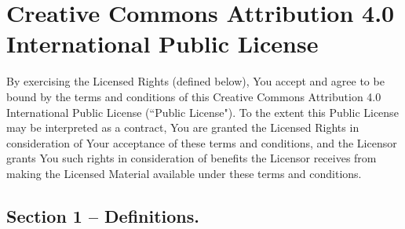 \chapter{Creative Commons Attribution 4.0 International Public License}
\label{AppendixB}

By exercising the Licensed Rights (defined below), You accept and agree to be bound by the terms and conditions of this Creative Commons Attribution 4.0 International Public License (``Public License"). To the extent this Public License may be interpreted as a contract, You are granted the Licensed Rights in consideration of Your acceptance of these terms and conditions, and the Licensor grants You such rights in consideration of benefits the Licensor receives from making the Licensed Material available under these terms and conditions.

\section{Section 1 – Definitions.}
\label{section1}

